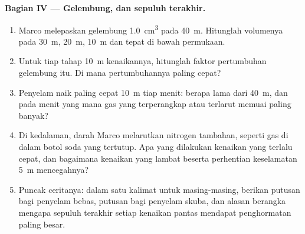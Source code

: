 \begin{problem}
\medskip
\noindent\textbf{Bagian IV --- Gelembung, dan sepuluh  terakhir.}
\begin{enumerate}[resume]
  \item Marco melepaskan gelembung \qty{1.0}{cm^3} pada \qty{40}{m}.
        Hitunglah volumenya pada \qty{30}{m}, \qty{20}{m}, \qty{10}{m}
        dan tepat di bawah permukaan.
  \item Untuk tiap tahap \qty{10}{m} kenaikannya, hitunglah faktor
        pertumbuhan gelembung itu. Di mana pertumbuhannya paling cepat?
  \item Penyelam naik paling cepat \qty{10}{m} tiap menit: berapa lama
        dari \qty{40}{m}, dan pada menit yang mana gas yang terperangkap
        atau terlarut memuai paling banyak?
  \item Di kedalaman, darah Marco melarutkan nitrogen tambahan, seperti
        gas di dalam botol soda yang tertutup. Apa yang dilakukan
        kenaikan yang terlalu cepat, dan bagaimana kenaikan yang lambat
        beserta perhentian keselamatan \qty{5}{m} mencegahnya?
  \item Puncak ceritanya: dalam satu kalimat untuk masing-masing,
        berikan putusan bagi penyelam bebas, putusan bagi penyelam
        skuba, dan alasan berangka mengapa sepuluh  terakhir
        setiap kenaikan pantas mendapat penghormatan paling besar.
\end{enumerate}
\end{problem}
